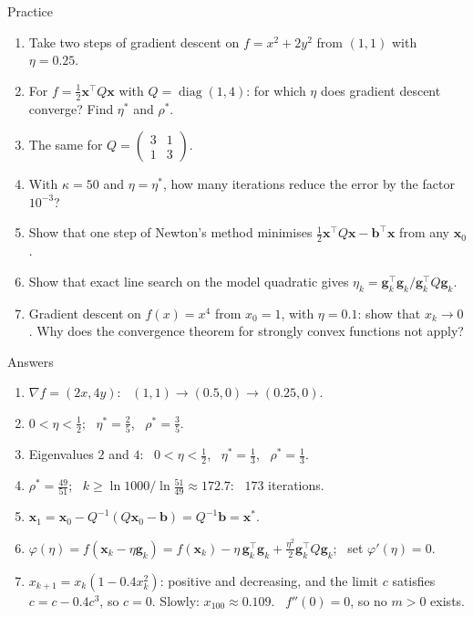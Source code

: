 \documentclass[10pt]{wosm-slides}
\newcommand{\vx}{\mathbf{x}}
\newcommand{\vb}{\mathbf{b}}
\newcommand{\vg}{\mathbf{g}}
\begin{document}
\begin{frame}{Practice}
  \small
  \begin{enumerate}
    \item Take two steps of gradient descent on $f = x^2 + 2y^2$ from $(1, 1)$ with $\eta = 0.25$.
    \item For $f = \frac12\vx^\top Q\vx$ with $Q = \operatorname{diag}(1, 4)$: for which $\eta$ does gradient
      descent converge? Find $\eta^*$ and $\rho^*$.
    \item The same for $Q = \begin{pmatrix} 3 & 1 \\ 1 & 3 \end{pmatrix}$.
    \item With $\kappa = 50$ and $\eta = \eta^*$, how many iterations reduce the error by the factor $10^{-3}$?
    \item Show that one step of Newton's method minimises $\frac12\vx^\top Q\vx - \vb^\top\vx$ from any $\vx_0$.
    \item Show that exact line search on the model quadratic gives
      $\eta_k = \vg_k^\top\vg_k / \vg_k^\top Q\vg_k$.
    \item Gradient descent on $f(x) = x^4$ from $x_0 = 1$, with $\eta = 0.1$: show that $x_k \to 0$.
      Why does the convergence theorem for strongly convex functions not apply?
  \end{enumerate}
\end{frame}

\begin{frame}{Answers}
  \small
  \begin{enumerate}
    \item $\nabla f = (2x, 4y)$: \ $(1, 1) \to (0.5, 0) \to (0.25, 0)$.
    \item $0 < \eta < \frac12$; \ $\eta^* = \frac25$, \ $\rho^* = \frac35$.
    \item Eigenvalues $2$ and $4$: \ $0 < \eta < \frac12$, \ $\eta^* = \frac13$, \ $\rho^* = \frac13$.
    \item $\rho^* = \frac{49}{51}$; \ $k \ge \ln 1000 / \ln\frac{51}{49} \approx 172.7$: \ $173$ iterations.
    \item $\vx_1 = \vx_0 - Q^{-1}(Q\vx_0 - \vb) = Q^{-1}\vb = \vx^*$.
    \item $\varphi(\eta) = f(\vx_k - \eta\vg_k) = f(\vx_k) - \eta\,\vg_k^\top\vg_k + \frac{\eta^2}{2}\vg_k^\top Q\vg_k$;
      \ set $\varphi'(\eta) = 0$.
    \item $x_{k+1} = x_k(1 - 0.4x_k^2)$: positive and decreasing, and the limit $c$ satisfies $c = c - 0.4c^3$,
      so $c = 0$. Slowly: $x_{100} \approx 0.109$. \ $f''(0) = 0$, so no $m > 0$ exists.
  \end{enumerate}
\end{frame}
\end{document}
